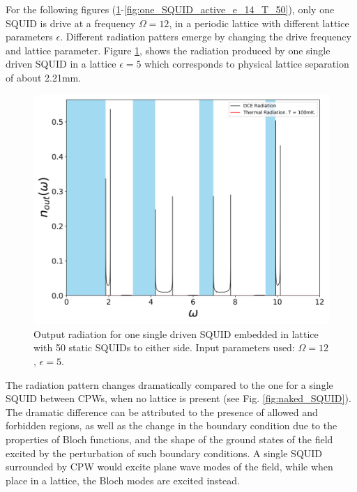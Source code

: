 For the following figures (\ref{fig:one_SQUID_active}-\ref{fig:one_SQUID_active_e_14_T_50}), only one SQUID is drive at a frequency $\Omega =12$, in a periodic lattice with different lattice parameters $\epsilon$. Different radiation patters emerge by changing the drive frequency and lattice parameter. Figure \ref{fig:one_SQUID_active}, shows the radiation produced by one single driven SQUID in a lattice $\epsilon=5$ which corresponds to physical lattice separation of about 2.21mm.
%
\begin{figure}
    \includegraphics[width=\textwidth, keepaspectratio]{figures/results/one_SQUID_active.png}
    \caption{Output radiation for one single driven SQUID embedded in lattice with 50 static SQUIDs to either side. Input parameters used: $\Omega=12$, $\epsilon=5$.}
    \label{fig:one_SQUID_active}
\end{figure}
%
\newpage
The radiation pattern changes dramatically compared to the one for a single SQUID between CPWs, when no lattice is present (see Fig. \ref{fig:naked_SQUID}). The dramatic difference can be attributed to the presence of allowed and forbidden regions, as well as the change in the boundary condition due to the properties of Bloch functions, and the shape of the ground states of the field excited by the perturbation of such boundary conditions. A single SQUID surrounded by CPW would excite plane wave modes of the field, while when place in a lattice, the Bloch modes are excited instead.
%
